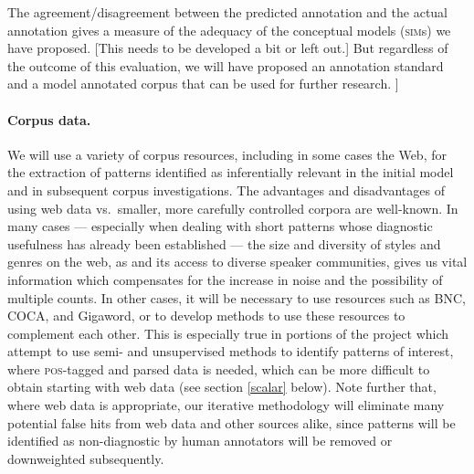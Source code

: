 \documentclass[10pt]{article}
\begin{document}
The agreement/disagreement between the predicted annotation and the actual annotation gives a measure of the adequacy of the conceptual models (\textsc{sim}s) we have proposed. [This needs to be developed a bit or left out.] But regardless of the outcome of this evaluation, we will have proposed an annotation standard and a model annotated corpus that can be used for further research. ]


\vspace {-4mm}

\paragraph{Corpus data.}
We will use a variety of corpus resources, including in some cases the Web, for the extraction of patterns identified as inferentially relevant in the initial model and in subsequent corpus investigations. 
The advantages and disadvantages of using web data vs.\ smaller, more carefully controlled corpora are well-known.
In many cases --- especially when dealing with short patterns whose diagnostic usefulness has already been established --- the size and diversity of styles and genres on the web, as and its access to diverse speaker communities, gives us vital information which compensates for the increase in noise and the possibility of multiple counts.
In other cases, it will be necessary to use resources such as BNC, COCA, and Gigaword, or to develop methods to use these resources to complement each other.
This is especially true in portions of the project which attempt to use semi- and unsupervised methods to identify patterns of interest, where \textsc{pos}-tagged and parsed data is needed, which can be more difficult to obtain starting with web data (see section \ref{scalar} below).
Note further that, where web data is appropriate, our iterative methodology will eliminate many potential false hits from web data and other sources alike, since patterns will be identified as non-diagnostic by human annotators will be removed or downweighted subsequently.
\end{document}
